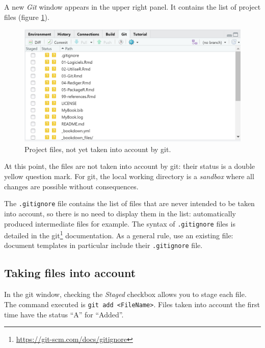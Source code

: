 \documentclass[
  12pt,
  american,
  a4paper,
  extrafontsizes,onecolumn,openright
  ]{memoir}
\begin{document}
\normalsize

A new \emph{Git} window appears in the upper right panel.
It contains the list of project files (figure \ref{fig:git-Fichiers}).



\scriptsize

\begin{figure}

{\centering \includegraphics[width=0.8\linewidth]{images/git-Fichiers} 

}

\caption{Project files, not yet taken into account by git.}\label{fig:git-Fichiers}
\end{figure}

\normalsize

At this point, the files are not taken into account by git: their status is a double yellow question mark.
For git, the local working directory is a \emph{sandbox} where all changes are possible without consequences.

The \texttt{.gitignore} file contains the list of files that are never intended to be taken into account, so there is no need to display them in the list: automatically produced intermediate files for example.
The syntax of \texttt{.gitignore} files is detailed in the git\footnote{\url{https://git-scm.com/docs/gitignore}} documentation.
As a general rule, use an existing file: document templates in particular include their \texttt{.gitignore} file.

\hypertarget{taking-files-into-account}{%
\subsection{Taking files into account}\label{taking-files-into-account}}

In the git window, checking the \emph{Staged} checkbox allows you to stage each file.
The command executed is \texttt{git\ add\ \textless{}FileName\textgreater{}}.
Files taken into account the first time have the status \enquote{A} for \enquote{Added}.
\end{document}
